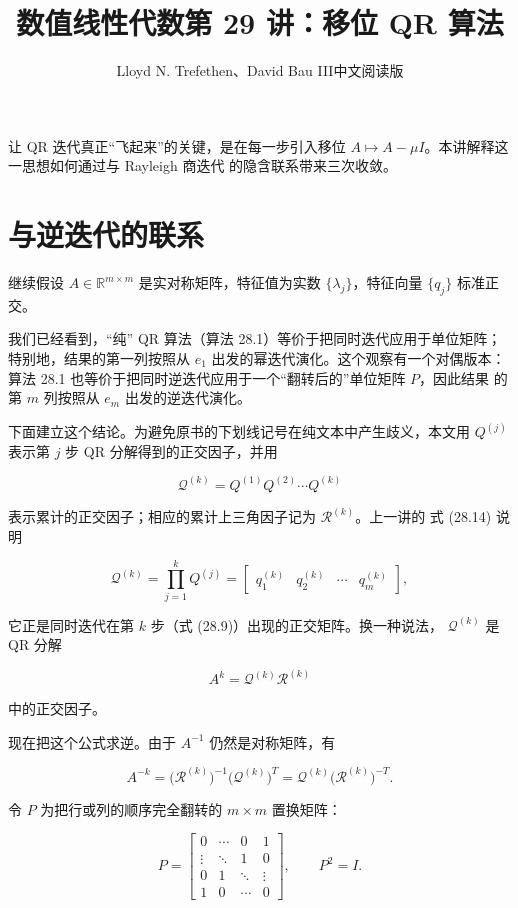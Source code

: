 \documentclass[UTF8,fontset=none,12pt]{ctexart}
\title{数值线性代数\quad 第 29 讲：移位 QR 算法}
\author{Lloyd N. Trefethen、David Bau III\quad 中文阅读版}
\date{}
\begin{document}
\maketitle
\pagestyle{plain}

让 QR 迭代真正“飞起来”的关键，是在每一步引入移位
$A\mathbin{\mapsto}A-\mu I$。本讲解释这一思想如何通过与 Rayleigh 商迭代
的隐含联系带来三次收敛。

\section*{与逆迭代的联系}

继续假设 $A\in\mathbb{R}^{m\times m}$ 是实对称矩阵，特征值为实数
$\{\lambda_j\}$，特征向量 $\{q_j\}$ 标准正交。

我们已经看到，“纯” QR 算法（算法 28.1）等价于把同时迭代应用于单位矩阵；
特别地，结果的第一列按照从 $e_1$ 出发的幂迭代演化。这个观察有一个对偶版本：
算法 28.1 也等价于把同时逆迭代应用于一个“翻转后的”单位矩阵 $P$，因此结果
的第 $m$ 列按照从 $e_m$ 出发的逆迭代演化。

下面建立这个结论。为避免原书的下划线记号在纯文本中产生歧义，本文用
$Q^{(j)}$ 表示第 $j$ 步 QR 分解得到的正交因子，并用

$$
\mathcal Q^{(k)}=Q^{(1)}Q^{(2)}\cdots Q^{(k)}
$$

表示累计的正交因子；相应的累计上三角因子记为 $\mathcal R^{(k)}$。上一讲的
式 (28.14) 说明

$$
\mathcal Q^{(k)}=\prod_{j=1}^{k}Q^{(j)}
 =\begin{bmatrix}q_1^{(k)}&q_2^{(k)}&\cdots&q_m^{(k)}\end{bmatrix},
$$

它正是同时迭代在第 $k$ 步（式 (28.9)）出现的正交矩阵。换一种说法，
$\mathcal Q^{(k)}$ 是 QR 分解

$$
A^k=\mathcal Q^{(k)}\mathcal R^{(k)}
$$

中的正交因子。

现在把这个公式求逆。由于 $A^{-1}$ 仍然是对称矩阵，有

\begin{equation}
A^{-k}=\bigl(\mathcal R^{(k)}\bigr)^{-1}
          \bigl(\mathcal Q^{(k)}\bigr)^T
        =\mathcal Q^{(k)}\bigl(\mathcal R^{(k)}\bigr)^{-T}.
\tag{29.1}
\end{equation}

令 $P$ 为把行或列的顺序完全翻转的 $m\times m$ 置换矩阵：

$$
P=\begin{bmatrix}
0&\cdots&0&1\\
\vdots&\ddots&1&0\\
0&1&\ddots&\vdots\\
1&0&\cdots&0
\end{bmatrix},
\qquad P^2=I.
$$
\end{document}
